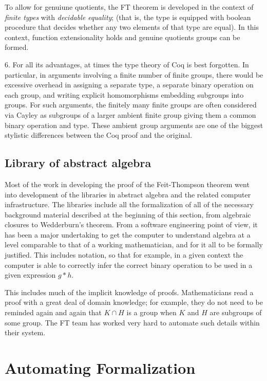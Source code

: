 \documentclass[brochure,english,12pt]{bourbaki}
\theoremstyle{plain}
\begin{document}
To allow for genuiune quotients, the FT theorem is developed in the context of {\it finite types} with {\it decidable equality};
(that is, the type is equipped with boolean procedure that decides whether any two elements of that type are equal).
In this context, function extensionality holds and genuine quotients groups can be formed.


6.  For all its advantages, at times the type theory of Coq is best forgotten.  In particular,
in arguments involving a finite number of finite groups, there would be excessive overhead in
assigning a separate type, a separate binary operation on each group, 
and writing explicit homomorphisms embedding subgroups into groups.
 For such arguments, the finitely many finite groups are
often considered via Cayley as subgroups of a larger ambient finite group giving them a common binary
operation and type.  These ambient group arguments are one of the biggest stylistic differences
between the Coq proof and the original.


\subsection{Library of abstract algebra}

Most of the work in developing the proof of the Feit-Thompson theorem went into development of the libraries in
abstract algebra and the related computer infrastructure.  The libraries include all the formalization of all
of the necessary background material described at the beginning of this section, from algebraic
closures to Wedderburn's theorem.  From a software engineering point of view, it has
been a major undertaking to get the computer to understand algebra at a level
comparable to that of a working mathematician, and for it all to be formally
justified.  This includes notation, so that for example,  in a 
given context the computer is able to correctly infer the correct binary operation 
to be used in a given expression $g*h$.  

This includes much of the implicit knowledge
of proofs.  Mathematicians read a proof with a great deal of domain knowledge;
for example, they do not need to be reminded again and again that $K \cap H$ is a group when
$K$ and $H$ are subgroups of some group.  The FT team has worked very hard
to automate such details within their system.



\section{Automating Formalization}
\end{document}

